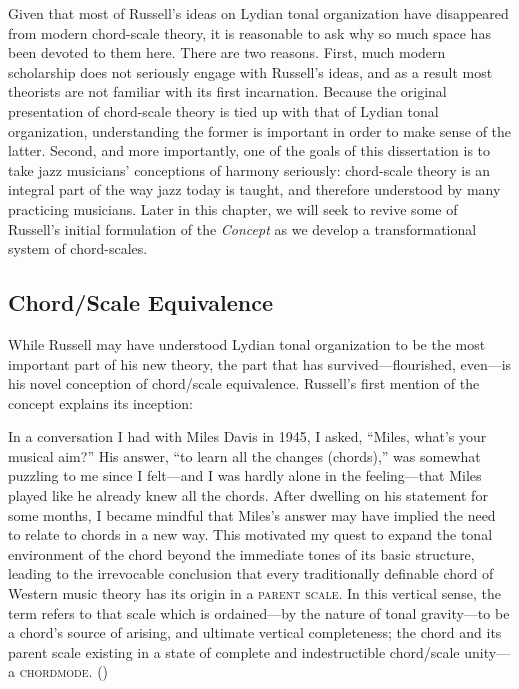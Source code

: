 Given that most of Russell's ideas on Lydian tonal organization have
disappeared from modern chord-scale theory, it is reasonable to ask why so
much space has been devoted to them here. There are two reasons. First, much
modern scholarship does not seriously engage with Russell's ideas, and as a
result most theorists are not familiar with its first incarnation. Because the
original presentation of chord-scale theory is tied up with that of Lydian
tonal organization, understanding the former is important in order to make
sense of the latter. Second, and more importantly, one of the goals of this
dissertation is to take jazz musicians' conceptions of harmony seriously:
chord-scale theory is an integral part of the way jazz today is taught, and
therefore understood by many practicing musicians. Later in this chapter, we
will seek to revive some of Russell's initial formulation of the
\emph{Concept} as we develop a transformational system of
chord-scales.

\subsection{Chord/Scale Equivalence}
\label{subsec:chord-scales}

While Russell may have understood Lydian tonal organization to be the most
important part of his new theory, the part that has survived---flourished,
even---is his novel conception of chord/scale equivalence.
Russell's first mention of the concept explains its inception:%
%
\begin{quoting}
  \singlespacing
  In a conversation I had with Miles Davis in 1945, I asked, ``Miles, what's
  your musical aim?'' His answer, ``to learn all the changes (chords),'' was
  somewhat puzzling to me since I felt---and I was hardly alone in the
  feeling---that Miles played like he already knew all the chords. After
  dwelling on his statement for some months, I became mindful that Miles's
  answer may have implied the need to relate to chords in a new way. This
  motivated my quest to expand the tonal environment of the chord beyond the
  immediate tones of its basic structure, leading to the irrevocable conclusion
  that every traditionally definable chord of Western music theory has its
  origin in a \textsc{parent scale}. In this vertical sense, the term refers to
  that scale which is ordained---by the nature of tonal gravity---to be a
  chord's source of arising, and ultimate vertical completeness; the chord and
  its parent scale existing in a state of complete and indestructible
  chord/scale unity---a \textsc{chordmode}. ()
\end{quoting}

